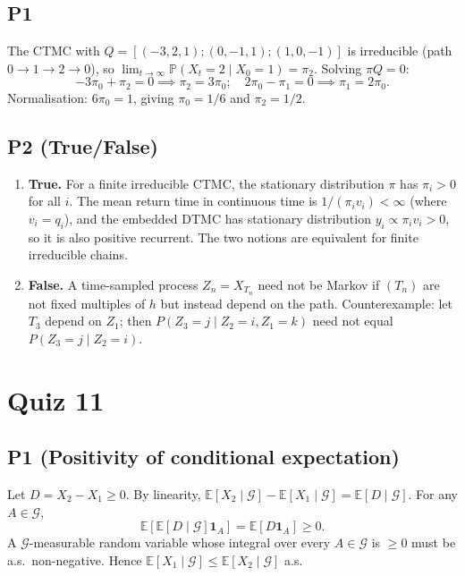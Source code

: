 \documentclass[11pt]{article}
\newcommand{\PP}{\mathbb{P}}
\newcommand{\EE}{\mathbb{E}}
\newcommand{\1}{\mathbf{1}}
\begin{document}
\subsection*{P1}
The CTMC with $Q=[(-3,2,1);(0,-1,1);(1,0,-1)]$ is irreducible (path $0\to1\to2\to0$), so $\lim_{t\to\infty}\PP(X_t=2\mid X_0=1)=\pi_2$.  Solving $\pi Q=0$:
\[
-3\pi_0+\pi_2=0\implies\pi_2=3\pi_0;\quad 2\pi_0-\pi_1=0\implies\pi_1=2\pi_0.
\]
Normalisation: $6\pi_0=1$, giving $\pi_0=1/6$ and $\pi_2=1/2$.

\subsection*{P2 (True/False)}
\begin{enumerate}
\item \textbf{True.} For a finite irreducible CTMC, the stationary distribution $\pi$ has $\pi_i>0$ for all $i$.  The mean return time in continuous time is $1/(\pi_i v_i)<\infty$ (where $v_i=q_i$), and the embedded DTMC has stationary distribution $y_i\propto\pi_i v_i>0$, so it is also positive recurrent.  The two notions are equivalent for finite irreducible chains.
\item \textbf{False.} A time-sampled process $Z_n=X_{T_n}$ need not be Markov if $(T_n)$ are not fixed multiples of $h$ but instead depend on the path.  Counterexample: let $T_3$ depend on $Z_1$; then $P(Z_3=j\mid Z_2=i, Z_1=k)$ need not equal $P(Z_3=j\mid Z_2=i)$.
\end{enumerate}

\section{Quiz 11}

\subsection*{P1 (Positivity of conditional expectation)}
Let $D=X_2-X_1\ge0$.  By linearity, $\EE[X_2\mid\mathcal G]-\EE[X_1\mid\mathcal G]=\EE[D\mid\mathcal G]$.  For any $A\in\mathcal G$,
\[
\EE[\EE[D\mid\mathcal G]\1_A]=\EE[D\1_A]\ge0.
\]
A $\mathcal G$-measurable random variable whose integral over every $A\in\mathcal G$ is $\ge0$ must be a.s.\ non-negative.  Hence $\EE[X_1\mid\mathcal G]\le\EE[X_2\mid\mathcal G]$ a.s.
\end{document}
